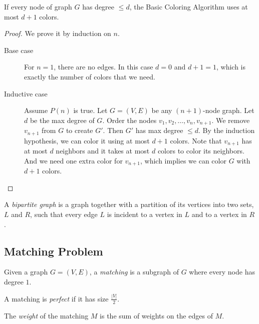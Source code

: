\documentclass[11pt]{article}
\begin{document}
\begin{theorem}
If every node of graph $G$ has degree $\leq d$, the Basic Coloring Algorithm uses at most $d+1$
colors.
\end{theorem}

\begin{proof}
We prove it by induction on $n$.

\begin{description}
\item[Base case] For $n=1$, there are no edges. In this case $d = 0$ and $d+1=1$, which is
exactly the number of colors that we need.
\item[Inductive case] Assume $P(n)$ is true. Let $G=(V,E)$ be any $(n+1)$-node graph. Let $d$ be
the max degree of $G$. Order the nodes $v_1,v_2,\dots,v_n,v_{n+1}$. We remove $v_{n+1}$ from $G$ to
create $G'$. Then $G'$ has max degree $\leq d$. By the induction hypothesis, we can color it using
at most $d+1$ colors. Note that $v_{n+1}$ has at most $d$ neighbors and it takes at most $d$ colors
to color its neighbors. And we need one extra color for $v_{n+1}$, which implies we can color $G$
with $d+1$ colors.
\end{description}
\end{proof}

\begin{definition}
A \emph{bipartite graph} is a graph together with a partition of its vertices into two sets, $L$ and
$R$, such that every edge $L$ is incident to a vertex in $L$ and to a vertex in $R$.
\end{definition}

\subsection{Matching Problem}

\begin{definition}
Given a graph $G = (V, E)$, a \emph{matching} is a subgraph of $G$ where every node has degree $1$.
\end{definition}

\begin{definition}
A matching is \emph{perfect} if it has size $\frac{|V|}{2}$.
\end{definition}

\begin{definition}
The \emph{weight} of the matching $M$ is the sum of weights on the edges of $M$.
\end{definition}
\end{document}
